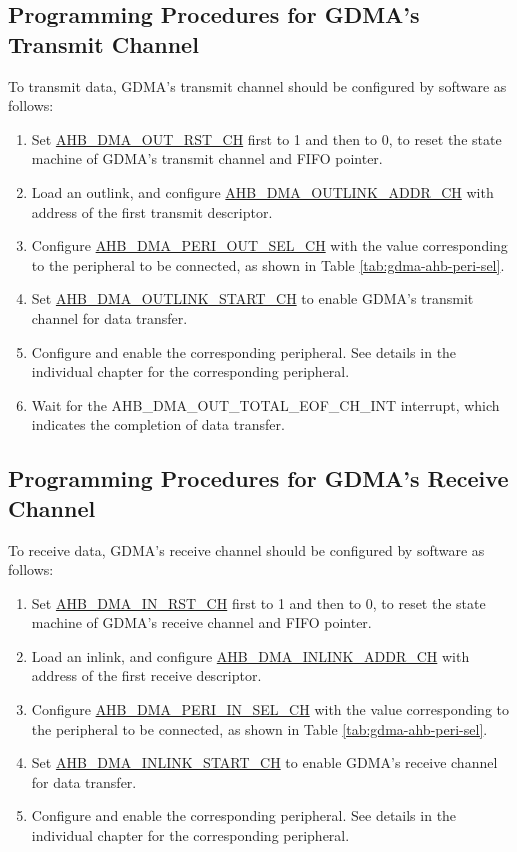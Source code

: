 \documentclass[main\_\_EN.tex]{subfiles}
\begin{document}
\subsection{Programming Procedures for GDMA's Transmit Channel}

To transmit data, GDMA's transmit channel should be configured by software as follows:
\begin{enumerate}
    \item Set \hyperref[fielddesc:AHBDMAOUTRSTCHN]{AHB\_DMA\_OUT\_RST\_CH} first to 1 and then to 0, to reset the state machine of GDMA's transmit channel and FIFO pointer.
    \item Load an outlink, and configure \hyperref[fielddesc:AHBDMAOUTLINKADDRCHN]{AHB\_DMA\_OUTLINK\_ADDR\_CH}  with address of the first transmit descriptor.
    \item Configure \hyperref[fielddesc:AHBDMAPERIOUTSELCHN]{AHB\_DMA\_PERI\_OUT\_SEL\_CH} with the value corresponding to the peripheral to be connected, as shown in Table \ref{tab:gdma-ahb-peri-sel}.
    \item Set \hyperref[fielddesc:AHBDMAOUTLINKSTARTCHN]{AHB\_DMA\_OUTLINK\_START\_CH} to enable GDMA's transmit channel for data transfer.
    \item Configure and enable the corresponding peripheral. See details in the individual chapter for the corresponding peripheral.
    \item Wait for the AHB\_DMA\_OUT\_TOTAL\_EOF\_CH\_INT interrupt, which indicates the completion of data transfer.
\end{enumerate}

\subsection{Programming Procedures for GDMA's Receive Channel}
To receive data, GDMA's receive channel should be configured by software as follows:
\begin{enumerate}
    \item Set \hyperref[fielddesc:AHBDMAINRSTCHN]{AHB\_DMA\_IN\_RST\_CH} first to 1 and then to 0, to reset the state machine of GDMA's receive channel and FIFO pointer.
    \item Load an inlink, and configure \hyperref[fielddesc:AHBDMAINLINKADDRCHN]{AHB\_DMA\_INLINK\_ADDR\_CH} with address of the first receive descriptor.
    \item Configure \hyperref[fielddesc:AHBDMAPERIINSELCHN]{AHB\_DMA\_PERI\_IN\_SEL\_CH} with the value corresponding to the peripheral to be connected, as shown in Table \ref{tab:gdma-ahb-peri-sel}.
    \item Set \hyperref[fielddesc:AHBDMAINLINKSTARTCHN]{AHB\_DMA\_INLINK\_START\_CH} to enable GDMA's receive channel for data transfer.
    \item Configure and enable the corresponding peripheral. See details in the individual chapter for the corresponding peripheral.
\end{enumerate}
\end{document}
